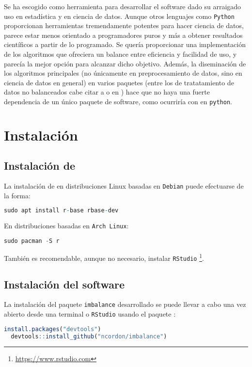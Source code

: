 Se ha escogido \R como herramienta para desarrollar el software dado su arraigado uso en estadística y en ciencia
de datos. Aunque otros lenguajes como \texttt{Python} proporcionan herramientas tremendamente potentes para
hacer ciencia de datos, \R parece estar menos orientado a programadores puros y más a obtener resultados
científicos a partir de lo programado. Se quería proporcionar una implementación de los algoritmos que 
ofreciera un balance entre eficiencia y facilidad de uso, y \R parecía la mejor opción para alcanzar dicho
objetivo. Además, la diseminación de los algoritmos principales (no únicamente en preprocesamiento de datos,
sino en ciencia de datos en general) en varios paquetes (entre los de tratatamiento de datos no balanceados cabe
citar a  o  en \R) hace que no haya una fuerte dependencia de un 
único paquete de software, como ocurriría con  en \texttt{python}.

\section{Instalación}
\subsection{Instalación de \R}
La instalación de \R en distribuciones Linux basadas en \texttt{Debian} puede efectuarse de la forma:
  \begin{lstlisting}[language=R,numbers=none]
  sudo apt install r-base rbase-dev
  \end{lstlisting}

En distribuciones basadas en \texttt{Arch Linux}:
  \begin{lstlisting}[language=R,numbers=none]
  sudo pacman -S r
  \end{lstlisting}

También es recomendable, aunque no necesario, instalar \texttt{RStudio} \footnote{\url{https://www.rstudio.com}}.

\subsection{Instalación del software}
La instalación del paquete \texttt{imbalance} desarrollado se puede llevar a cabo una vez abierto desde 
una terminal \R o \texttt{RStudio} usando el paquete :
  \begin{lstlisting}[language=R,numbers=none]
  install.packages("devtools")
  devtools::install_github("ncordon/imbalance")
  \end{lstlisting}

